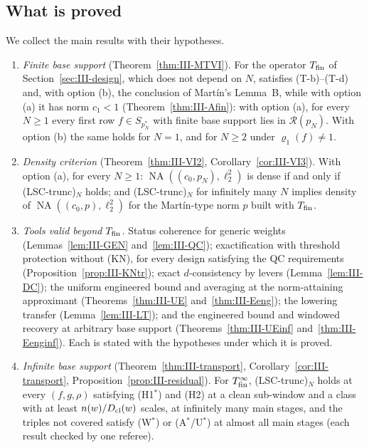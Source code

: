 \documentclass[10pt]{amsart}
\theoremstyle{definition}
\theoremstyle{remark}
\newcommand{\NA}{\operatorname{NA}}
\newcommand{\Rec}{\mathcal R}
\begin{document}
\subsection{What is proved}
We collect the main results with their hypotheses.
\begin{enumerate}
\item[(1)] \emph{Finite base support} (Theorem~\ref{thm:III-MTVI}).  For the
operator $T_{\rm fin}$ of Section~\ref{sec:III-design}, which does not
depend on $N$, satisfies (T-b)--(T-d) and, with option (b), the conclusion
of Mart\'in's Lemma~B, while with option (a) it has norm $c_1<1$
(Theorem~\ref{thm:III-Afin}): with option (a), for every
$N\ge1$ every first row $f\in S_{p_N^*}$ with finite base support lies in
$\Rec(p_N)$.  With option (b) the same holds for $N=1$, and for $N\ge2$ under
$\varrho_1(f)\ne1$.
\item[(2)] \emph{Density criterion} (Theorem~\ref{thm:III-VI2},
Corollary~\ref{cor:III-VI3}).  With option (a), for every $N\ge1$:
$\NA((c_0,p_N),\ell_2^2)$ is dense if and only if (LSC-trunc)$_N$ holds; and
(LSC-trunc)$_N$ for infinitely many $N$ implies density of
$\NA((c_0,p),\ell_2^2)$ for the Mart\'in-type norm $p$ built with
$T_{\rm fin}$.
\item[(3)] \emph{Tools valid beyond $T_{\rm fin}$.}  Status coherence for
generic weights (Lemmas~\ref{lem:III-GEN} and~\ref{lem:III-QC}); exactification
with threshold protection without (KN), for every design satisfying the QC
requirements (Proposition~\ref{prop:III-KNtr});
exact $d$-consistency by levers (Lemma~\ref{lem:III-DC}); the uniform
engineered bound and averaging at the norm-attaining approximant
(Theorems~\ref{thm:III-UE} and~\ref{thm:III-Eeng}); the lowering transfer
(Lemma~\ref{lem:III-LT}); and the engineered bound and windowed recovery at
arbitrary base support (Theorems~\ref{thm:III-UEinf}
and~\ref{thm:III-Eenginf}).  Each is stated with the hypotheses under which
it is proved.
\item[(4)] \emph{Infinite base support} (Theorem~\ref{thm:III-transport},
Corollary~\ref{cor:III-transport}, Proposition~\ref{prop:III-residual}).  For
$T^\infty_{\rm fin}$, (LSC-trunc)$_N$ holds at every $(f,g,\rho)$ satisfying
(H1$^*$) and (H2) at a clean sub-window and a class with at least
$n(w)/D_{\rm cl}(w)$ scales, at infinitely many main stages, and the triples
not covered satisfy (W$^*$) or (A$^*$/U$^*$) at almost all main stages
(each result checked by one referee).
\end{enumerate}
\end{document}
